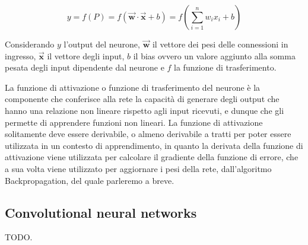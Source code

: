 \begin{equation}
    \label{eq:neuron}
    y = f(P) = f(\vec{\mathbf{w}} \cdot \vec{\mathbf{x}} + b) = f(\sum_{i=1}^{n} w_i x_i + b)
\end{equation}

Considerando $y$ l'output del neurone, $\vec{\mathbf{w}}$ il vettore dei pesi delle connessioni in ingresso, 
$\vec{\mathbf{x}}$ il vettore degli input, $b$ il bias ovvero un valore aggiunto alla somma pesata degli input 
dipendente dal neurone e $f$ la funzione di trasferimento.

La funzione di attivazione o funzione di trasferimento del neurone è la componente che conferisce alla rete la capacità di generare degli output
che hanno una relazione non lineare rispetto agli input ricevuti, e dunque che gli permette di apprendere funzioni non lineari.
La funzione di attivazione solitamente deve essere derivabile, o almeno derivabile a tratti per poter essere utilizzata in un contesto di apprendimento,
in quanto la derivata della funzione di attivazione viene utilizzata per calcolare il gradiente della funzione di errore, che a sua volta viene utilizzato
per aggiornare i pesi della rete, dall'algoritmo Backpropagation, del quale parleremo a breve.


    

\subsection{Convolutional neural networks}

    TODO.